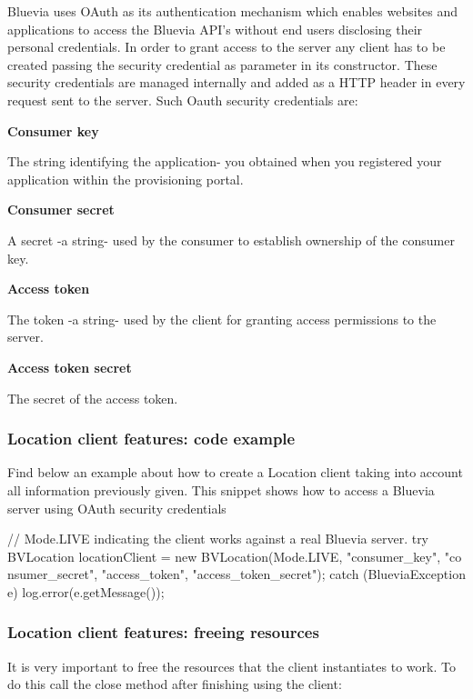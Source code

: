 Bluevia uses OAuth as its authentication mechanism which enables websites and applications to access the Bluevia API's without end users disclosing their personal credentials. In order to grant access to the server any client has to be created passing the security credential as parameter in its constructor. These security credentials are managed internally and added as a HTTP header in every request sent to the server. Such Oauth security credentials are: 
\begin{DoxyItemize}
\item {\bfseries Consumer key} \par
The string identifying the application-\/ you obtained when you registered your application within the provisioning portal.


\item {\bfseries Consumer secret} \par
A secret -\/a string-\/ used by the consumer to establish ownership of the consumer key.


\item {\bfseries Access token} \par
The token -\/a string-\/ used by the client for granting access permissions to the server.


\item {\bfseries Access token secret} \par
The secret of the access token. 
\end{DoxyItemize}\hypertarget{blv_location_guide_locationclient_features_code_example}{}\subsubsection{Location client features: code example}\label{blv_location_guide_locationclient_features_code_example}
Find below an example about how to create a Location client taking into account all information previously given. This snippet shows how to access a Bluevia server using OAuth security credentials


\begin{DoxyCode}
// Mode.LIVE indicating the client works against a real Bluevia server.
try {
        BVLocation locationClient = new BVLocation(Mode.LIVE, "consumer_key", "co
      nsumer_secret", "access_token", "access_token_secret");
} catch (BlueviaException e){
        log.error(e.getMessage());
}
\end{DoxyCode}
\hypertarget{blv_location_guide_locationclient_features_freeing_resources_sec}{}\subsubsection{Location client features: freeing resources}\label{blv_location_guide_locationclient_features_freeing_resources_sec}
It is very important to free the resources that the client instantiates to work. To do this call the close method after finishing using the client:


